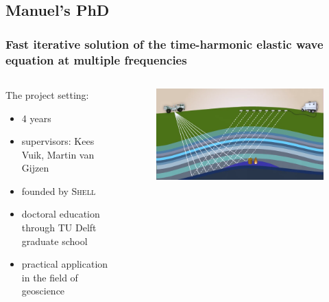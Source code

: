 \documentclass{beamer}
\begin{document}
\subsection{Manuel's PhD}
\begin{frame}
\frametitle{Fast iterative solution of the time-harmonic elastic wave equation at multiple frequencies}
\begin{columns}
\begin{column}{0.6\textwidth}
 The project setting:
 \begin{itemize}
  \item 4 years
  \item supervisors: Kees Vuik, Martin van Gijzen
  \item founded by \textsc{Shell}
  \item doctoral education through TU Delft graduate school
  \item practical application in the field of geoscience
 \end{itemize}
\end{column}
\begin{column}{0.4\textwidth}
\begin{figure}[t]
\centering
\includegraphics[width=\textwidth]{images/snapshot1.png}
\end{figure}
\end{column}
\end{columns}

\end{frame}
\end{document}
